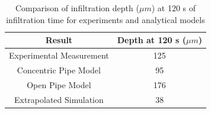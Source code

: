 \documentclass[conf]{new-aiaa}
\begin{document}
\begin{table}[htb!]
    \centering
    \caption{Comparison of infiltration depth ($\mu m$) at 120 s of infiltration time for experiments and analytical models}
    \begin{tabular}{c|c}
        Result & Depth at 120 s ($\mu m$) \\
        \hline
        Experimental Measurement & 125 \\ Concentric Pipe Model & 95 \\ Open Pipe Model & 176\\
        Extrapolated Simulation & 38
    \end{tabular}

    \label{tab:compareInfilDepth}
\end{table}



\clearpage

\end{document}
